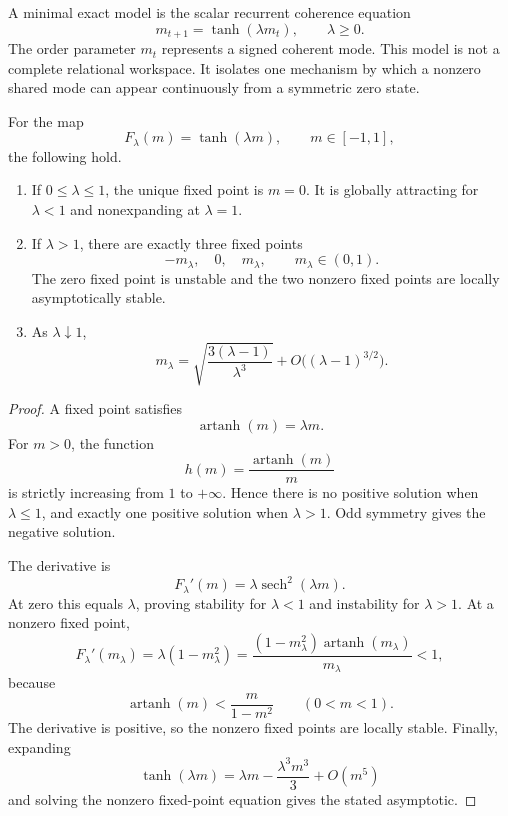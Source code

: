 
A minimal exact model is the scalar recurrent coherence equation
\[
\boxed{
m_{t+1}=\tanh(\lambda m_t),
\qquad
\lambda\geq0.
}
\]
The order parameter \(m_t\) represents a signed coherent mode. This model is
not a complete relational workspace. It isolates one mechanism by which a
nonzero shared mode can appear continuously from a symmetric zero state.

\begin{theorem}\label{thm:pitchfork-formation}
For the map
\[
F_\lambda(m)=\tanh(\lambda m),
\qquad
m\in[-1,1],
\]
the following hold.
\begin{enumerate}
\item If \(0\leq\lambda\leq1\), the unique fixed point is \(m=0\).
 It is globally attracting for \(\lambda<1\) and nonexpanding at
 \(\lambda=1\).
\item If \(\lambda>1\), there are exactly three fixed points
 \[
 -m_\lambda,
 \quad0,
 \quad m_\lambda,
 \qquad
 m_\lambda\in(0,1).
 \]
 The zero fixed point is unstable and the two nonzero fixed points are
 locally asymptotically stable.
\item As \(\lambda\downarrow1\),
 \[
 \boxed{
 m_\lambda
 =
 \sqrt{\frac{3(\lambda-1)}{\lambda^3}}
 +
 O\bigl((\lambda-1)^{3/2}\bigr).
 }
 \]
\end{enumerate}
\end{theorem}

\begin{proof}
A fixed point satisfies
\[
\operatorname{artanh}(m)=\lambda m.
\]
For \(m>0\), the function
\[
h(m)=\frac{\operatorname{artanh}(m)}{m}
\]
is strictly increasing from \(1\) to \(+\infty\). Hence there is no positive
solution when \(\lambda\leq1\), and exactly one positive solution when
\(\lambda>1\). Odd symmetry gives the negative solution.

The derivative is
\[
F_\lambda'(m)
=
\lambda\operatorname{sech}^2(\lambda m).
\]
At zero this equals \(\lambda\), proving stability for \(\lambda<1\) and
instability for \(\lambda>1\). At a nonzero fixed point,
\[
F_\lambda'(m_\lambda)
=
\lambda(1-m_\lambda^2)
=
\frac{(1-m_\lambda^2)\operatorname{artanh}(m_\lambda)}{m_\lambda}
<1,
\]
because
\[
\operatorname{artanh}(m)
<
\frac{m}{1-m^2}
\qquad(0<m<1).
\]
The derivative is positive, so the nonzero fixed points are locally stable.
Finally, expanding
\[
\tanh(\lambda m)
=
\lambda m-
\frac{\lambda^3m^3}{3}
+O(m^5)
\]
and solving the nonzero fixed-point equation gives the stated asymptotic.
\end{proof}

